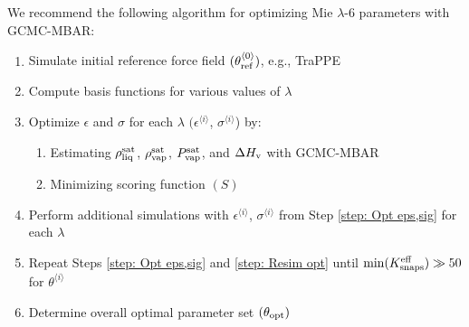 \documentclass[journal=jced,manuscript=article]{achemso}
\begin{document}

We recommend the following algorithm for optimizing Mie $\lambda$-6 parameters with GCMC-MBAR:
\begin{enumerate}
	\item Simulate initial reference force field $(\theta^{\langle0\rangle}_{\rm ref})$, e.g., TraPPE \label{step: Sim ref}
	\item Compute basis functions for various values of $\lambda$ \label{step: Basis Functions}
    \item Optimize $\epsilon$ and $\sigma$ for each $\lambda$ $(\epsilon^{\langle i \rangle}$, $\sigma^{\langle i \rangle}$) by: \label{step: Opt eps,sig}
	\begin{enumerate}
		\item Estimating $\rho_{\rm liq}^{\rm sat}$, $\rho_{\rm vap}^{\rm sat}$, $P_{\rm vap}^{\rm sat}$, and $\Delta H_{\rm v}$ with GCMC-MBAR
		\item Minimizing scoring function $(S)$
	\end{enumerate}
	\item Perform additional simulations with $\epsilon^{\langle i \rangle}$, $\sigma^{\langle i \rangle}$ from Step \ref{step: Opt eps,sig} for each $\lambda$ \label{step: Resim opt}
	\item Repeat Steps \ref{step: Opt eps,sig} and \ref{step: Resim opt} until $\min(K_{\rm snaps}^{\rm eff}) \gg 50$ for $\theta^{\langle i \rangle}$
	\item Determine overall optimal parameter set $(\theta_{\rm opt})$ \label{step: Opt eps,sig,lam}
\end{enumerate}
\end{document}
